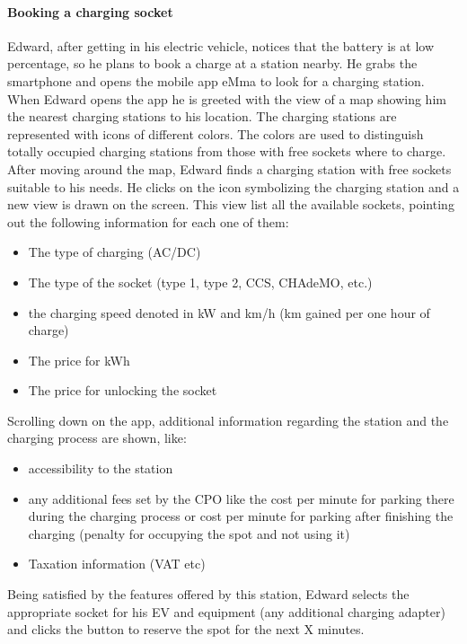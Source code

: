 \paragraph{Booking a charging socket}
Edward, after getting in his electric vehicle, notices that the battery is at low percentage, so he plans to book a charge at a station nearby. He grabs the smartphone and opens the mobile app eMma to look for a charging station. When Edward opens the app he is greeted with the view of a map showing him the nearest charging stations to his location. The charging stations are represented with icons of different colors. The colors are used to distinguish totally occupied charging stations from those with free sockets where to charge. After moving around the map, Edward finds a charging station with free sockets suitable to his needs. He clicks on the icon symbolizing the charging station and a new view is drawn on the screen. This view list all the available sockets, pointing out the following information for each one of them:
\begin{itemize}
    \item The type of charging (AC/DC)
    \item The type of the socket (type 1, type 2, CCS, CHAdeMO, etc.)
    \item the charging speed denoted in kW and km/h (km gained per one hour of charge)
    \item The price for kWh
    \item The price for unlocking the socket
\end{itemize}
Scrolling down on the app, additional information regarding the station and the charging process are shown, like:
\begin{itemize}
    \item accessibility to the station
    \item any additional fees set by the CPO like the cost per minute for parking there during the charging process or cost per minute for parking after finishing the charging (penalty for occupying the spot and not using it)
    \item Taxation information (VAT etc)
\end{itemize}
Being satisfied by the features offered by this station, Edward selects the appropriate socket for his EV and equipment (any additional charging adapter) and clicks the button to reserve the spot for the next X minutes.


